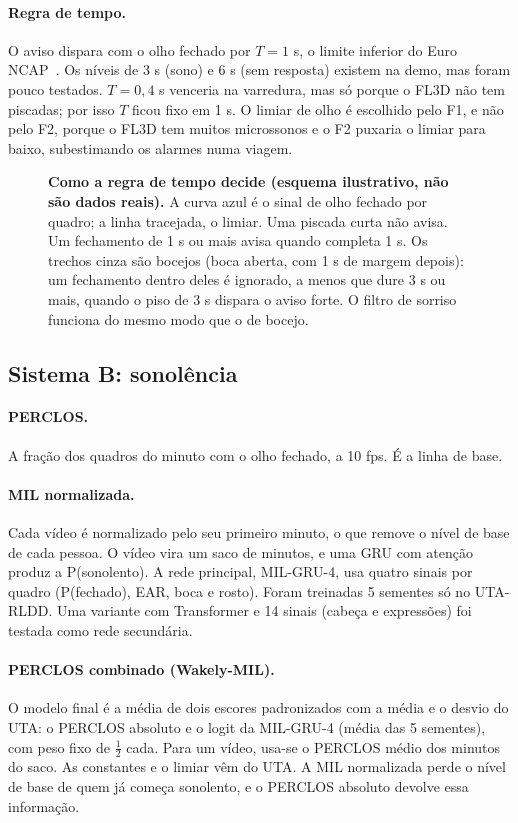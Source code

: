 \documentclass[11pt,a4paper]{article}
\newcommand{\fig}[1]{\resizebox{\textwidth}{!}{}}
\begin{document}
\paragraph{Regra de tempo.} O aviso dispara com o olho fechado por $T = 1$ s, o limite inferior do Euro NCAP~\cite{euroncap}. Os níveis de 3 s (sono) e 6 s (sem resposta) existem na demo, mas foram pouco testados. $T = 0{,}4$ s venceria na varredura, mas só porque o FL3D não tem piscadas; por isso $T$ ficou fixo em 1 s. O limiar de olho é escolhido pelo F1, e não pelo F2, porque o FL3D tem muitos microssonos e o F2 puxaria o limiar para baixo, subestimando os alarmes numa viagem.

\begin{figure}[!t]
\centering
\fig{fig_regra.tex}
\caption{\textbf{Como a regra de tempo decide (esquema ilustrativo, não são dados reais).} A curva azul é o sinal de olho fechado por quadro; a linha tracejada, o limiar. Uma piscada curta não avisa. Um fechamento de 1 s ou mais avisa quando completa 1 s. Os trechos cinza são bocejos (boca aberta, com 1 s de margem depois): um fechamento dentro deles é ignorado, a menos que dure 3 s ou mais, quando o piso de 3 s dispara o aviso forte. O filtro de sorriso funciona do mesmo modo que o de bocejo.}
\label{fig:regra}
\end{figure}

\subsection{Sistema B: sonolência}

\paragraph{PERCLOS.} A fração dos quadros do minuto com o olho fechado, a 10 fps. É a linha de base.

\paragraph{MIL normalizada.} Cada vídeo é normalizado pelo seu primeiro minuto, o que remove o nível de base de cada pessoa. O vídeo vira um saco de minutos, e uma GRU com atenção produz a P(sonolento). A rede principal, MIL-GRU-4, usa quatro sinais por quadro (P(fechado), EAR, boca e rosto). Foram treinadas 5 sementes só no UTA-RLDD. Uma variante com Transformer e 14 sinais (cabeça e expressões) foi testada como rede secundária.

\paragraph{PERCLOS combinado (Wakely-MIL).} O modelo final é a média de dois escores padronizados com a média e o desvio do UTA: o PERCLOS absoluto e o logit da MIL-GRU-4 (média das 5 sementes), com peso fixo de $\tfrac12$ cada. Para um vídeo, usa-se o PERCLOS médio dos minutos do saco. As constantes e o limiar vêm do UTA. A MIL normalizada perde o nível de base de quem já começa sonolento, e o PERCLOS absoluto devolve essa informação.
\end{document}
